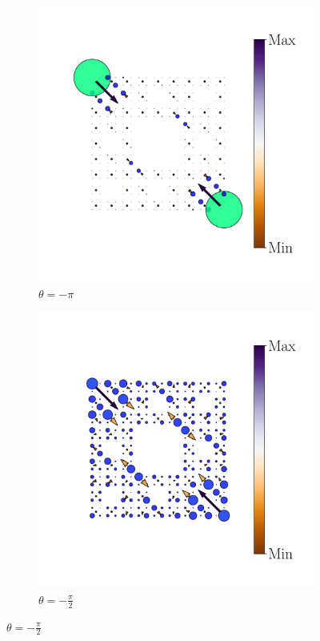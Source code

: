 \begin{figure}[h!]
     \centering
    \captionsetup[sub]{font=small}
     \begin{minipage}[h!]{1.1\textwidth}
         \begin{subfigure}[b!]{0.2 \textwidth}
             \caption{$\theta = -\pi$}
             \includegraphics[width=\textwidth]{Imagenes/Resultados_pump_Fractal/xy/hoti_pomp_xy_pos1.pdf}
         \end{subfigure}\hspace*{-0.5em}
          \begin{subfigure}[b!]{0.2 \textwidth}
             \caption*{$\theta = -\frac{\pi}{2}$}
             \includegraphics[width=\textwidth]{Imagenes/Resultados_pump_Fractal/xy/hoti_pomp_xy_pos2.pdf}

\end{subfigure}
\end{minipage}
\end{figure}
